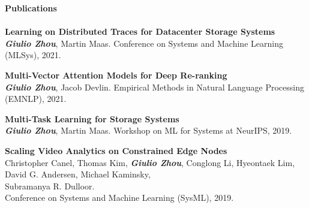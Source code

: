 \documentclass{article}
\begin{document}

\noindent
\textbf{\Large Publications}\\[-2mm]
\HRule\\
\noindent
\textbf{Learning on Distributed Traces for Datacenter Storage Systems} \\
\indent
\hspace{-4.5mm}
{\small \textit{\textbf{Giulio Zhou}}, Martin Maas. Conference on Systems and Machine Learning (MLSys), 2021.} \\
\vspace{-2mm}

\noindent
\textbf{Multi-Vector Attention Models for Deep Re-ranking} \\
\indent
\hspace{-4.5mm}
{\small \textit{\textbf{Giulio Zhou}}, Jacob Devlin. Empirical Methods in Natural Language Processing (EMNLP), 2021.} \\
\vspace{-2mm}

\noindent
\textbf{Multi-Task Learning for Storage Systems} \\
\indent
\hspace{-4.5mm}
{\small \textit{\textbf{Giulio Zhou}}, Martin Maas. Workshop on ML for Systems at NeurIPS, 2019.} \\
\vspace{-2mm}

\noindent
\textbf{Scaling Video Analytics on Constrained Edge Nodes} \\
\indent
\hspace{-4.5mm}
{\small Christopher Canel, Thomas Kim, \textit{\textbf{Giulio Zhou}}, Conglong Li, Hyeontaek Lim, David G. Andersen, Michael Kaminsky, } \\
\indent
\hspace{-4.5mm}
{\small Subramanya R. Dulloor. } \\
\indent
\hspace{-4.5mm}
{\small Conference on Systems and Machine Learning (SysML), 2019.} \\
\vspace{-2mm}
\end{document}
